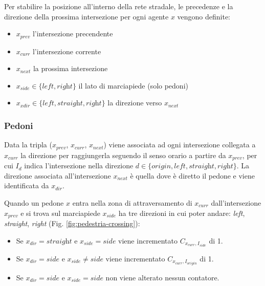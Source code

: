 Per stabilire la posizione all'interno della rete stradale, le precedenze e la direzione della prossima intersezione per ogni agente $x$
vengono definite:
\begin{itemize}
    \item $x_{prev}$ l'intersezione precendente
    \item $x_{curr}$ l'intersezione corrente
    \item $x_{next}$ la prossima intersezione
    \item $x_{side} \in \{ \textit{left}, \textit{right} \}$  il lato di marciapiede (solo pedoni)
    \item $x_{xdir} \in \{\textit{left}, \textit{straight}, \textit{right}\}$ la direzione verso $x_{next}$
\end{itemize}

\newpage
\subsubsection{Pedoni}

Data la tripla ($x_{prev}$, $x_{curr}$, $x_{next}$) viene associata ad ogni intersezione collegata a $x_{curr}$ la direzione per raggiungerla seguendo il senso orario a partire da $x_{prev}$,
per cui $I_d$ indica l'intersezione nella direzione $d \in \{\textit{origin}, \textit{left}, \textit{straight}, \textit{right}\}$.
%
La direzione associata all'intersezione $x_{next}$ è quella dove è diretto il pedone e viene identificata da $x_{dir}$.

Quando un pedone $x$ entra nella zona di attraversamento di $x_{curr}$ dall'intersezione $x_{prev}$ e si trova sul marciapiede $x_{side}$
ha tre direzioni in cui poter andare: \textit{left}, \textit{straight}, \textit{right} (Fig. \ref{fig:pedestria-crossing}):
\begin{itemize}
    \item Se $x_{dir} = \textit{straight}$ e $x_{side} = \textit{side}$ viene incrementato $C_{x_{curr}, I_{\textit{side}}}$ di 1.
    \item Se $x_{dir} = \textit{side}$ e $x_{side} \neq \textit{side}$ viene incrementato $C_{x_{curr}, I_{\textit{origin}}}$ di 1.
    \item Se  $x_{dir} = \textit{side}$ e $x_{side} = \textit{side}$ non viene alterato nessun contatore.
\end{itemize}

